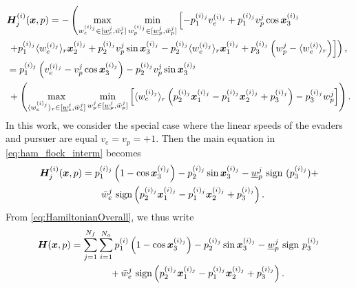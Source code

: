 %
\begin{align}
\begin{split}
&\hamfunc^{(i)}_j(\state, p)=- \left(\max_{w_e^{(i)_j} \in [\underline{w}_e^j, \bar{w}_e^j]}  \min_{w_p^{(i)_j}  \in [\underline{w}_p^{j}, \bar{w}_p^j]}  
\left[
-p_1^{(i)_j} v_e^{(i)_j} + p_1^{(i)_j} v_p^{j} \cos \state_3^{(i)_j} 
\right. \right.  \\ 
%
& \left. \left. +  p_1^{(i)_j}\langle w_e^{(i)_j} \rangle_r \state_2^{(i)_j} 
%
+ p_2^{(i)_j} v_p^{j} \sin \state_3^{(i)_j} - p_2^{(i)_j} \langle w_e^{(i)_j} \rangle_r  \state_1^{(i)_j} 
%
+ p_3^{(i)_j}\left(w_p^j - \langle w_e^{(i)} \rangle_r\right)
\right] 
%
\right),
\\
%
&=p_1^{(i)_j} \left(v_e^{(i)_j} - v_p^{j} \cos \state_3^{(i)_j}\right) -  p_2^{(i)_j} v_p^{j} \sin \state_3^{(i)_j}  \\
%
& \, + \left(		
\max_{\langle w_e^{(i)_j}\rangle_r \in [\underline{w}_e^j, \bar{w}_e^j]}  \min_{w_p^{j}  \in [\underline{w}_p^{j}, \bar{w}_p^j]} \begin{bmatrix}
\langle w_e^{(i)_j}\rangle_r \left(p_2^{(i)_j} \state_1^{(i)_j} - p_1^{(i)_j}  \state_2^{(i)_j} + p_3^{(i)_j}\right) 
% 
- p_3^{(i)_j} w_p^j 
\end{bmatrix}
\right).
\end{split}
%
\label{eq:ham_flock_interm}
\end{align}
%
In this work, we consider the special case where the linear speeds of the evaders and pursuer are equal \ie $v_e = v_p = +1$.  Then the main equation in \eqref{eq:ham_flock_interm} becomes 
%
\begin{align}
\bm{H}^{(i)}_j(\bm{x}, p) &= p_1^{(i)_j} \left(1 - \cos \bm{x}_3^{(i)_j}\right) - p_2^{(i)_j} \sin \bm{x}_3^{(i)_j} - \underline{w}_p^j \text{ sign }(p_3^{(i)_j}) + \nonumber 	\\
& \qquad  \bar{w}_e^j \text{ sign}\left(p_2^{(i)_j} \bm{x}_1^{(i)_j} - p_1^{(i)_j}\bm{x}_2^{(i)_j} + p_3^{(i)_j}\right)  .
\end{align}
%
From \eqref{eq:HamiltonianOverall}, we thus write
%
\begin{align}
\hamfunc(\state, p) &= \sum_{j=1}^{N_f} \sum_{i=1}^{N_a} p_1^{(i)} \left(1 - \cos \state_3^{(i)_j}\right) - p_2^{(i)_j} \sin \state_3^{(i)_j} - \underline{w}_p^j \text{ sign } p_3^{(i)_j}  \nonumber 	\\
& \qquad\qquad %
+ \bar{w}_e^j \text{ sign} \left( p_2^{(i)_j} \state_1^{(i)_j} - p_1^{(i)_j}\state_2^{(i)_j} + p_3^{(i)_j}\right).
\label{eq:HamiltonianCompletada}
\end{align}
%

